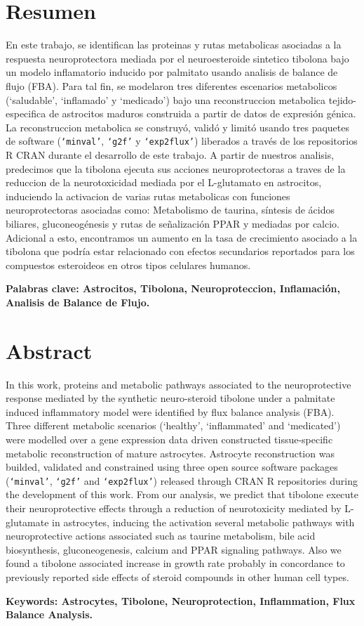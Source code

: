 \newpage{\pagestyle{empty}\cleardoublepage}
\newpage
\section*{Resumen}
En este trabajo, se identifican las proteinas y rutas metabolicas asociadas a la respuesta neuroprotectora mediada por el neuroesteroide sintetico tibolona bajo un modelo inflamatorio inducido por palmitato usando analisis de balance de flujo (FBA). Para tal fin, se modelaron tres diferentes escenarios metabolicos (`saludable', `inflamado' y `medicado') bajo una reconstruccion metabolica tejido-especifica de astrocitos maduros construida a partir de datos de expresión génica. La reconstruccion metabolica se construyó, validó y limitó usando tres paquetes de software (\texttt{`minval'}, \texttt{`g2f'} y \texttt{`exp2flux'}) liberados a través de los repositorios R CRAN durante el desarrollo de este trabajo. A partir de nuestros analisis, predecimos que la tibolona ejecuta sus acciones neuroprotectoras a traves de la reduccion de la neurotoxicidad mediada por el L-glutamato en astrocitos, induciendo la activacion de varias rutas metabolicas con funciones neuroprotectoras asociadas como: Metabolismo de taurina, síntesis de ácidos biliares, gluconeogénesis y rutas de señalización PPAR y mediadas por calcio. Adicional a esto, encontramos un aumento en la tasa de crecimiento asociado a la tibolona que podría estar relacionado con efectos secundarios reportados para los compuestos esteroideos en otros tipos celulares humanos.

\textbf{Palabras clave: Astrocitos, Tibolona, Neuroproteccion, Inflamación, Analisis de Balance de Flujo.}

\section*{Abstract}
In this work, proteins and metabolic pathways associated to the neuroprotective response mediated by the synthetic neuro-steroid tibolone under a palmitate induced inflammatory model were identified by flux balance analysis (FBA). Three different metabolic scenarios (`healthy', `inflammated' and `medicated') were modelled over a gene expression data driven constructed tissue-specific metabolic reconstruction of mature astrocytes. Astrocyte reconstruction was builded, validated and constrained using three open source software packages (\texttt{`minval'}, \texttt{`g2f'} and \texttt{`exp2flux'}) released through CRAN R repositories during the development of this work. From our analysis, we predict that tibolone execute their neuroprotective effects through a reduction of neurotoxicity mediated by L-glutamate in astrocytes, inducing the activation several metabolic pathways with neuroprotective actions associated such as taurine metabolism, bile acid biosynthesis, gluconeogenesis, calcium and PPAR signaling pathways.  Also we found a tibolone associated increase in growth rate probably in concordance to previously reported side effects of steroid compounds in other human cell types.

\textbf{Keywords: Astrocytes, Tibolone, Neuroprotection, Inflammation, Flux Balance Analysis.}
\clearpage\null\newpage
